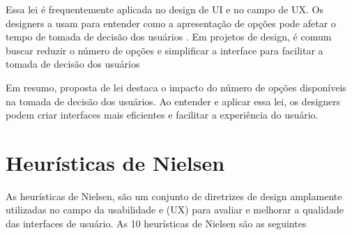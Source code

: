 Essa lei é frequentemente aplicada no design de \gls{UI} e no campo de \gls{UX}. Os designers a usam para entender como a apresentação de opções pode afetar o tempo de tomada de decisão dos usuários . Em projetos de design, é comum buscar reduzir o número de opções e simplificar a interface para facilitar a tomada de decisão dos usuários

Em resumo, proposta de lei destaca o impacto do número de opções disponíveis na tomada de decisão dos usuários. Ao entender e aplicar essa lei, os designers podem criar interfaces mais eficientes e facilitar a experiência do usuário.

\section{Heurísticas de Nielsen}

As heurísticas de Nielsen, são um conjunto de diretrizes de design amplamente utilizadas no campo da usabilidade e (\gls{UX}) para avaliar e melhorar a qualidade das interfaces de usuário. As 10 heurísticas de Nielsen são as seguintes  \cite{nielsen1994usability}

